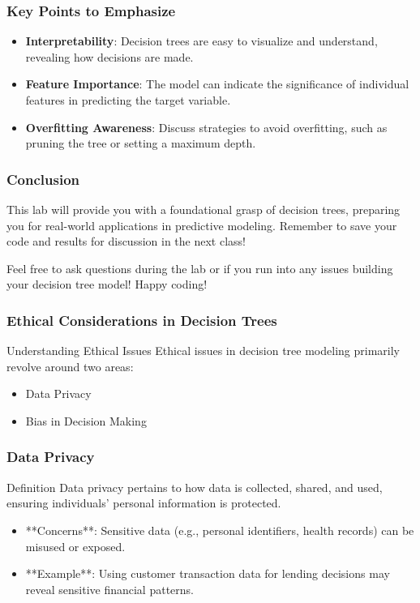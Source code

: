 \documentclass[aspectratio=169]{beamer}
\begin{document}
\begin{frame}
    \frametitle{Key Points to Emphasize}
    \begin{itemize}
        \item \textbf{Interpretability}: Decision trees are easy to visualize and understand, revealing how decisions are made.
        \item \textbf{Feature Importance}: The model can indicate the significance of individual features in predicting the target variable.
        \item \textbf{Overfitting Awareness}: Discuss strategies to avoid overfitting, such as pruning the tree or setting a maximum depth.
    \end{itemize}
\end{frame}

\begin{frame}
    \frametitle{Conclusion}
    This lab will provide you with a foundational grasp of decision trees, preparing you for real-world applications in predictive modeling. Remember to save your code and results for discussion in the next class!

    Feel free to ask questions during the lab or if you run into any issues building your decision tree model! Happy coding!
\end{frame}

\begin{frame}[fragile]
  \frametitle{Ethical Considerations in Decision Trees}
  \begin{block}{Understanding Ethical Issues}
    Ethical issues in decision tree modeling primarily revolve around two areas:
    \begin{itemize}
      \item Data Privacy
      \item Bias in Decision Making
    \end{itemize}
  \end{block}
\end{frame}

\begin{frame}[fragile]
  \frametitle{Data Privacy}
  \begin{block}{Definition}
    Data privacy pertains to how data is collected, shared, and used, ensuring individuals’ personal information is protected.
  \end{block}
  \begin{itemize}
    \item **Concerns**: Sensitive data (e.g., personal identifiers, health records) can be misused or exposed.
    \item **Example**: Using customer transaction data for lending decisions may reveal sensitive financial patterns.
  \end{itemize}
\end{frame}
\end{document}

